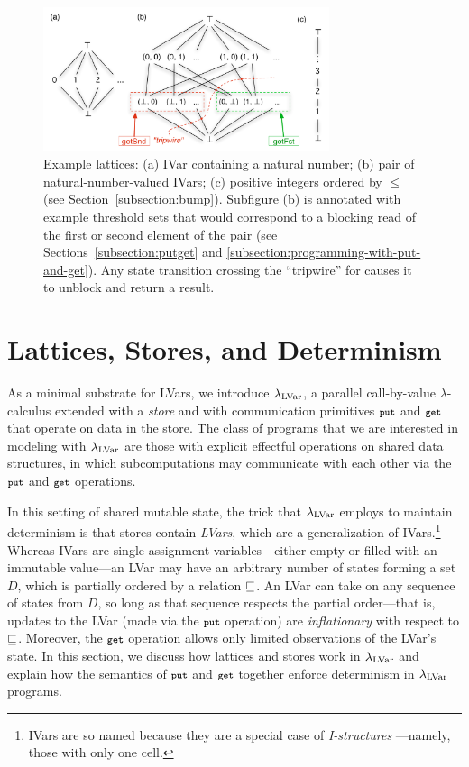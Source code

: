\begin{figure}[tb]
\centering
\includegraphics[width=3.3in,natwidth=633px,natheight=319px]{chapter2/figures/ExampleLattices2.pdf} 
  \caption{\footnotesize Example lattices: (a) IVar
    containing a natural number; (b) pair of natural-number-valued IVars; (c)
    positive integers ordered by $\leq$ (see Section~\ref{subsection:bump}).
    Subfigure (b) is annotated with example threshold
    sets that would correspond to a blocking read of the first or
    second element of the pair (see Sections~\ref{subsection:putget} and \ref{subsection:programming-with-put-and-get}).
    Any state transition crossing the
    ``tripwire'' for  causes it to unblock
    and return a result.}

  \label{f:lattice-examples}
\end{figure}

\section{Lattices, Stores, and Determinism}\label{section:domains}

As a minimal substrate for LVars, we introduce $\textup{\ensuremath{\lambda_{\textrm{LVar}}}}$, 
 a parallel call-by-value
$\lambda$-calculus extended with a {\em store} and with communication
primitives $\mbox{\footnotesize \texttt{put}}$ and $\mbox{\footnotesize \texttt{get}}$ that operate on data in the store.
The class of programs that we are interested in modeling with
$\textup{\ensuremath{\lambda_{\textrm{LVar}}}}$ are those with explicit effectful operations on shared
data
structures, in which subcomputations may communicate with each other
via the $\mbox{\footnotesize \texttt{put}}$ and
$\mbox{\footnotesize \texttt{get}}$ operations.

In this setting of shared mutable state, the trick
that $\textup{\ensuremath{\lambda_{\textrm{LVar}}}}$ employs to maintain determinism is that stores
contain {\em LVars}, which are a generalization of
IVars.\footnote{IVars are so named because they are a
    special case of {\em I-structures} \cite{IStructures}---namely,
    those with only one cell.}
Whereas IVars are single-assignment
variables---either empty or filled with an immutable value---an LVar
may have an arbitrary number of states forming a set $D$, which is partially ordered by a relation 
$\sqsubseteq$.  An LVar can take on any sequence of states from 
$D$, so long as that sequence respects the partial order---that is,
updates to the LVar (made via the $\mbox{\footnotesize \texttt{put}}$ operation) are
\emph{inflationary} %
 with respect to $\sqsubseteq$.  Moreover, the 
 $\mbox{\footnotesize \texttt{get}}$ operation allows only limited observations of the LVar's state.  In
this section, we discuss how lattices and stores work in $\textup{\ensuremath{\lambda_{\textrm{LVar}}}}$
and explain how the semantics of $\mbox{\footnotesize \texttt{put}}$ and $\mbox{\footnotesize \texttt{get}}$ together enforce determinism
in $\textup{\ensuremath{\lambda_{\textrm{LVar}}}}$ programs.

